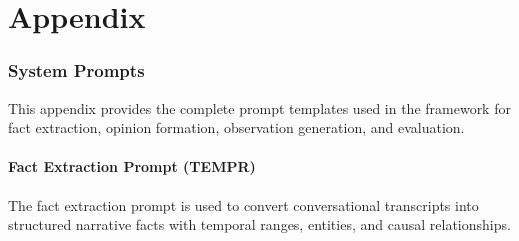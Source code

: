 \appendix
\clearpage
{} %
\part{Appendix} %
\parttoc %

\section{System Prompts}
\label{sec:appendix-prompts}

This appendix provides the complete prompt templates used in the \our framework for fact extraction, opinion formation, observation generation, and evaluation.

\subsection{Fact Extraction Prompt (TEMPR)}
\label{sec:appendix-fact-extraction}

The fact extraction prompt is used to convert conversational transcripts into structured narrative facts with temporal ranges, entities, and causal relationships.

